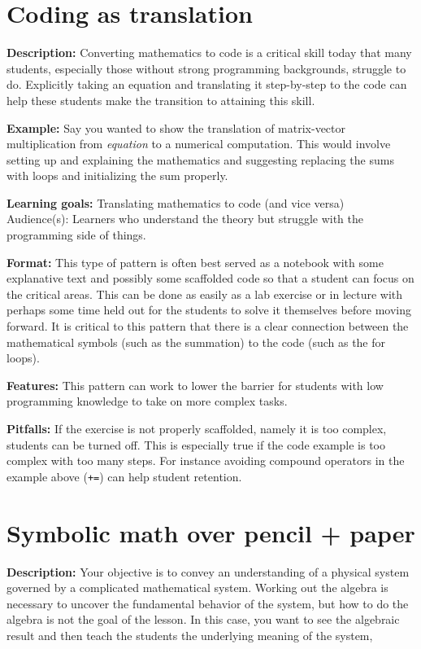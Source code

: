 \documentclass[]{book}
\begin{document}
\section{Coding as translation}\label{coding-as-translation}

\textbf{Description:} Converting mathematics to code is a critical skill
today that many students, especially those without strong programming
backgrounds, struggle to do. Explicitly taking an equation and
translating it step-by-step to the code can help these students make the
transition to attaining this skill.

\textbf{Example:} Say you wanted to show the translation of
matrix-vector multiplication from \emph{equation} to a numerical
computation. This would involve setting up and explaining the
mathematics and suggesting replacing the sums with loops and
initializing the sum properly.

\textbf{Learning goals:} Translating mathematics to code (and vice
versa)\\
Audience(s): Learners who understand the theory but struggle with the
programming side of things.

\textbf{Format:} This type of pattern is often best served as a notebook
with some explanative text and possibly some scaffolded code so that a
student can focus on the critical areas. This can be done as easily as a
lab exercise or in lecture with perhaps some time held out for the
students to solve it themselves before moving forward. It is critical to
this pattern that there is a clear connection between the mathematical
symbols (such as the summation) to the code (such as the for loops).

\textbf{Features:} This pattern can work to lower the barrier for
students with low programming knowledge to take on more complex tasks.

\textbf{Pitfalls:} If the exercise is not properly scaffolded, namely it
is too complex, students can be turned off. This is especially true if
the code example is too complex with too many steps. For instance
avoiding compound operators in the example above (\texttt{+=}) can help
student retention.

\section{Symbolic math over pencil +
paper}\label{symbolic-math-over-pencil-paper}

\textbf{Description:} Your objective is to convey an understanding of a
physical system governed by a complicated mathematical system. Working
out the algebra is necessary to uncover the fundamental behavior of the
system, but how to do the algebra is not the goal of the lesson. In this
case, you want to see the algebraic result and then teach the students
the underlying meaning of the system,
\end{document}
